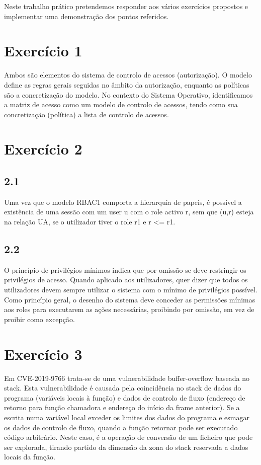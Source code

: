 \documentclass[11pt]{report}
\begin{document}
Neste trabalho prático pretendemos responder aos vários exercícios propostos e implementar uma demonstração dos pontos referidos.

\newpage


\section{Exercício 1}
	Ambos são elementos do sistema de controlo de acessos (autorização). O modelo define as regras gerais seguidas no âmbito da autorização, enquanto as políticas são a concretização do modelo. No contexto do Sistema Operativo, identificamos a matriz de acesso como um modelo de controlo de acessos, tendo como sua concretização (política) a lista de controlo de acessos.

\section{Exercício 2}
	\subsection*{2.1}
	Uma vez que o modelo RBAC1 comporta a hierarquia de papeis, é possível a existência de uma sessão com um user u com o role activo r, sem que (u,r) esteja na relação UA, se o utilizador tiver o role r1 e r <= r1.
	
	\subsection*{2.2}
	O princípio de privilégios mínimos indica que por omissão se deve restringir os privilégios de acesso.
	Quando aplicado aos utilizadores, quer dizer que todos os utilizadores devem sempre utilizar o sistema com o mínimo de privilégios possível.
	Como princípio geral, o desenho do sistema deve conceder as permissões mínimas aos roles para executarem as ações necessárias, proibindo por omissão, em vez de proibir como excepção.

\section{Exercício 3}
	Em CVE-2019-9766 trata-se de uma vulnerabilidade buffer-overflow baseada no stack. Esta vulnerabilidade é causada pela coincidência no stack de dados do programa (variáveis locais à função) e dados de controlo de fluxo (endereço de retorno para função chamadora e endereço do início da frame anterior). Se a escrita numa variável local exceder os limites dos dados do programa e esmagar os dados de controlo de fluxo, quando a função retornar pode ser executado código arbitrário. Neste caso, é a operação de conversão de um ficheiro que pode ser explorada, tirando partido da dimensão da zona do stack reservada a dados locais da função.
\end{document}
